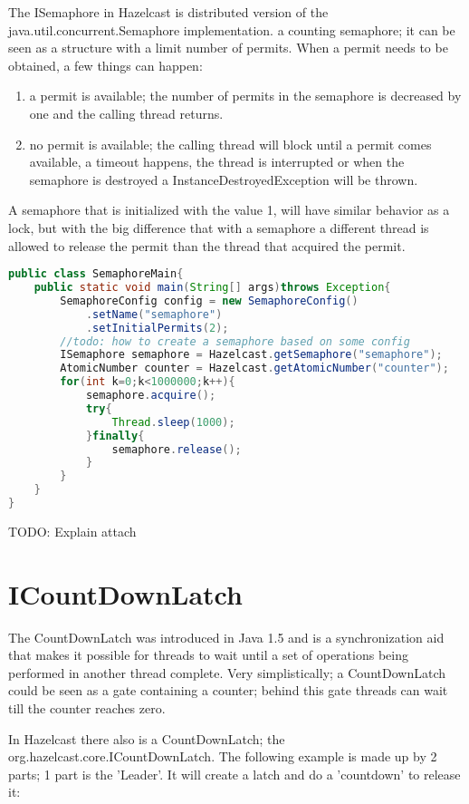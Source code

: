 The ISemaphore in Hazelcast is distributed version of the java.util.concurrent.Semaphore implementation. a counting semaphore; it can be seen as a structure with a limit number of permits. When a permit needs to be obtained, a few things can happen:
\begin{enumerate}
\item a permit is available; the number of permits in the semaphore is decreased by one and the calling thread returns.
\item no permit is available; the calling thread will block until a permit comes available, a timeout happens, the thread is interrupted or when the semaphore is destroyed a InstanceDestroyedException will be thrown.
\end{enumerate}

A semaphore that is initialized with the value 1, will have similar behavior as a lock, but with the big difference that with a semaphore a different thread is allowed to release the permit than the thread that acquired the permit.

\begin{lstlisting}[language=java]
public class SemaphoreMain{
    public static void main(String[] args)throws Exception{
        SemaphoreConfig config = new SemaphoreConfig()
            .setName("semaphore")
            .setInitialPermits(2);
        //todo: how to create a semaphore based on some config
        ISemaphore semaphore = Hazelcast.getSemaphore("semaphore");
        AtomicNumber counter = Hazelcast.getAtomicNumber("counter");
        for(int k=0;k<1000000;k++){
            semaphore.acquire();
            try{
                Thread.sleep(1000);
            }finally{
                semaphore.release();
            }
        }
    }
}
\end{lstlisting}

TODO: Explain attach

\section{ICountDownLatch}
The CountDownLatch was introduced in Java 1.5 and is a synchronization aid that makes it possible for threads to wait until a set of operations being performed in another thread  complete. Very simplistically; a CountDownLatch could be seen as a gate containing a counter; behind this gate threads can wait till the counter reaches zero. 

In Hazelcast there also is a CountDownLatch; the org.hazelcast.core.ICountDownLatch. The following example is made up by 2 parts; 1 part is the 'Leader'. It will create a latch and do a 'countdown' to release it:

